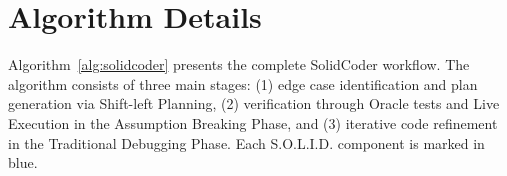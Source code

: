 \documentclass[11pt]{article}
\begin{document}


\appendix


\section{Algorithm Details}
\label{app:algorithm}

Algorithm~\ref{alg:solidcoder} presents the complete SolidCoder workflow. The algorithm consists of three main stages: (1) edge case identification and plan generation via Shift-left Planning, (2) verification through Oracle tests and Live Execution in the Assumption Breaking Phase, and (3) iterative code refinement in the Traditional Debugging Phase. Each S.O.L.I.D. component is marked in blue.
\end{document}

